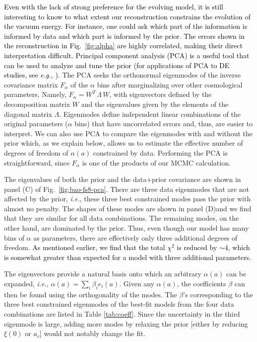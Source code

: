 \documentclass[prd,twocolumn,preprintnumbers,amsmath,amssymb,nofootinbib,english,showpacs]{revtex4-1}
\newcommand{\mv}{\textcolor{black}}
\def\ie{{\frenchspacing\it i.e.}}
\def\eg{{\frenchspacing\it e.g.}}
\begin{document}
\mv{Even with the lack of strong preference for the evolving model, it is still interesting to know to what extent our reconstruction constrains the evolution of the vacuum energy. For instance, one could ask which part of the information is informed by data and which part is informed by the prior. The errors shown in the reconstruction in Fig.~\ref{fig:alpha} are highly correlated, making their direct interpretation difficult. Principal component analysis (PCA) is a useful tool that can be used to analyze and tune the prior (for applications of PCA to DE studies, see \eg, \cite{Huterer:2002Jul,Crittenden:2009Dec,Crittenden:2011Dec}).} The PCA seeks the orthonormal eigenmodes of the inverse covariance matrix $F_{\alpha}$ of the $\alpha$ bins after marginalizing over other cosmological parameters. Namely, $F_{\alpha}=W^T\, \Lambda \,W$, with eigenvectors defined by the decomposition matrix $W$ and the eigenvalues given by the elements of the diagonal matrix $\Lambda$. Eigenmodes define independent linear combinations of the original parameters ($\alpha$ bins) that have uncorrelated errors and, thus, are easier to interpret. We can also use PCA to compare the eigenmodes with and without the prior which, as we explain below, allows us to estimate the effective number of degrees of freedom of $\alpha(a)$ constrained by data. Performing the PCA is straightforward, since $F_{\alpha}$ is one of the products of our MCMC calculation.

The eigenvalues of both the prior and the data+prior covariance are shown in panel (C) of Fig.~\ref{fig:bao-fs8-pca}. There are three data eigenmodes that are not affected by the prior, \ie, these three best constrained modes pass the prior with almost no penalty. The shapes of these modes are shown in panel (D)and we find that they are similar for all data combinations. The remaining modes, on the other hand, are dominated by the prior. Thus, even though our model has many bins of $\alpha$ as parameters, there are effectively only three additional degrees of freedom. \mv{As mentioned earlier, we find that the total $\chi^2$ is reduced by $\sim4$, which is somewhat greater than expected for a model with three additional parameters. }

The eigenvectors provide a natural basis onto which an arbitrary $\alpha(a)$ can be expanded, \ie, $\alpha(a)=\sum_i \beta_i e_i(a)$. Given any $\alpha(a)$, the coefficients $\beta$ can then be found using the orthogonality of the modes. The $\beta$'s corresponding to the three best constrained eigenmodes of the best-fit models from the four data combinations are listed in Table \ref{tab:coeff}. Since the uncertainty in the third eigenmode is large, adding more modes by relaxing the prior [either by reducing $\xi(0)$ or $a_c$] would not notably change the fit.
\end{document}
